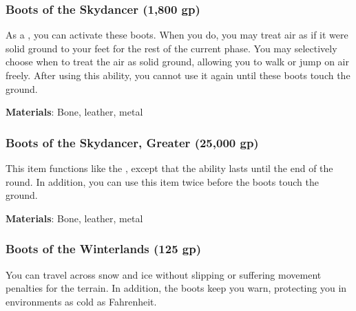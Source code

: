 \lowercase{\hypertarget{item:Boots of the Skydancer}{}}\label{item:Boots of the Skydancer}
\hypertarget{item:Boots of the Skydancer}{\subsubsection{Boots of the Skydancer\hfill{} (1,800 gp)}}

As a , you can activate these boots.
When you do, you may treat air as if it were solid ground to your feet for the rest of the current phase.
You may selectively choose when to treat the air as solid ground, allowing you to walk or jump on air freely.
After using this ability, you cannot use it again until these boots touch the ground.



\vspace{0.25em}
\textbf{Materials}: Bone, leather, metal


\lowercase{\hypertarget{item:Boots of the Skydancer, Greater}{}}\label{item:Boots of the Skydancer, Greater}
\hypertarget{item:Boots of the Skydancer, Greater}{\subsubsection{Boots of the Skydancer, Greater\hfill{} (25,000 gp)}}

This item functions like the , except that the ability lasts until the end of the round.
In addition, you can use this item twice before the boots touch the ground.



\vspace{0.25em}
\textbf{Materials}: Bone, leather, metal


\lowercase{\hypertarget{item:Boots of the Winterlands}{}}\label{item:Boots of the Winterlands}
\hypertarget{item:Boots of the Winterlands}{\subsubsection{Boots of the Winterlands\hfill{} (125 gp)}}

You can travel across snow and ice without slipping or suffering movement penalties for the terrain.
In addition, the boots keep you warn, protecting you in environments as cold as  Fahrenheit.



